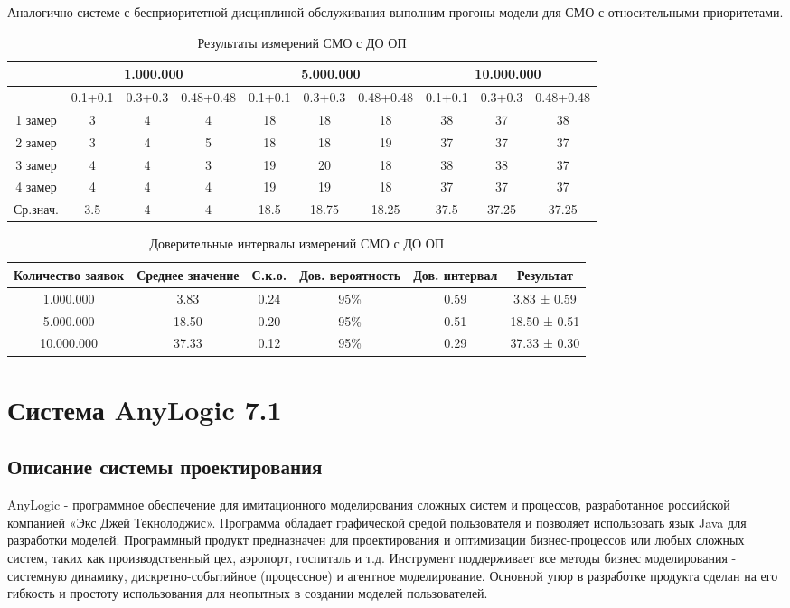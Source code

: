 \documentclass[a4paper,14pt]{report} %
\begin{document}
Аналогично системе с бесприоритетной дисциплиной обслуживания выполним прогоны модели для СМО с относительными приоритетами.

\begin{table}[h!]
\caption{Результаты измерений СМО с ДО ОП}
\begin{tabular}{|c|c|c|c|c|c|c|c|c|c|}
\hline
 & \multicolumn{3}{|c|}{1.000.000} & \multicolumn{3}{|c|}{5.000.000} & \multicolumn{3}{|c|}{10.000.000} \\
\hline
 & 0.1+0.1 & 0.3+0.3 & 0.48+0.48 & 0.1+0.1 & 0.3+0.3 & 0.48+0.48 & 0.1+0.1 & 0.3+0.3 & 0.48+0.48 \\
\hline
1 замер & 3 & 4 & 4 & 18 & 18 & 18 & 38 & 37 & 38  \\
\hline
2 замер & 3 & 4 & 5 & 18 & 18 & 19 & 37 & 37 & 37 \\
\hline
3 замер &  4 & 4 & 3 & 19 & 20 & 18 & 38 & 38 & 37 \\
\hline
4 замер & 4 & 4 & 4 & 19 & 19 & 18 & 37 & 37 & 37 \\
\hline
Ср.знач. &  3.5 & 4 & 4 & 18.5 & 18.75 & 18.25 & 37.5 & 37.25 & 37.25 \\
\hline
\end{tabular}
\end{table} 

\begin{table}[h!]
\caption{Доверительные интервалы измерений СМО с ДО ОП}
\begin{tabular}{|c|c|c|c|c|c|}
\hline
 Количество заявок & Среднее значение & С.к.о. & Дов. вероятность & Дов. интервал & Результат\\
\hline
1.000.000 & 3.83 & 0.24 & 95\% & 0.59 & 3.83 ± 0.59 \\
\hline
5.000.000 & 18.50 & 0.20 & 95\% & 0.51 & 18.50 ± 0.51 \\
\hline
10.000.000 & 37.33 & 0.12 & 95\% &0.29 & 37.33 ± 0.30 \\
\hline
\end{tabular}
\end{table} 

\section{Система AnyLogic 7.1}
\subsection{Описание системы проектирования}
AnyLogic - программное обеспечение для имитационного моделирования сложных систем и процессов, разработанное российской компанией «Экс Джей Текнолоджис». Программа обладает графической средой пользователя и позволяет использовать язык Java для разработки моделей. Программный продукт предназначен для проектирования и оптимизации бизнес-процессов или любых сложных систем, таких как производственный цех, аэропорт, госпиталь и т.д. Инструмент поддерживает все методы бизнес моделирования - системную динамику, дискретно-событийное (процессное) и агентное моделирование. Основной упор в разработке продукта сделан на его гибкость и простоту использования для неопытных в создании моделей пользователей.
\end{document}
